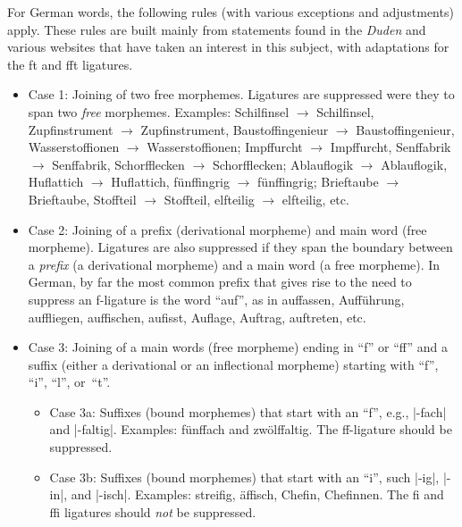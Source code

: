 \documentclass[11pt]{article}
\begin{document}
For German words, the following rules (with various exceptions and adjustments) apply. These rules are built mainly from statements found in the \emph{Duden} and various websites that have taken an interest in this subject, with adaptations for the ft and fft ligatures.
\begin{itemize}
\item Case 1: Joining of two free morphemes. Ligatures are suppressed were they to span two \emph{free} morphemes. Examples: Schil\mbox{fi}nsel $\to$ Schilfinsel, Zup\mbox{fi}nstrument $\to$ Zupfinstrument, Bausto\mbox{ffi}ngenieur $\to$ Baustoffingenieur, Wassersto\mbox{ffi}onen $\to$ Wasserstoffionen; Imp\mbox{ff}urcht $\to$ Impffurcht, Sen\mbox{ff}abrik $\to$ Senffabrik, Schor\mbox{ffl}ecken $\to$ Schorfflecken; Ablau\mbox{fl}ogik $\to$ Ablauflogik, Hu\mbox{fl}attich $\to$ Huflattich, fün\mbox{ffi}ngrig $\to$ fünf\mbox{fi}ngrig; Brie\mbox{ft}aube $\to$ Brieftaube, Sto\mbox{fft}eil $\to$ Stoffteil, el\mbox{ft}eilig $\to$ elfteilig, etc.


\item Case 2: Joining of a prefix (derivational morpheme) and main word (free morpheme). Ligatures are also suppressed if they span the boundary between a \emph{prefix} (a derivational morpheme) and a main word (a free morpheme). In German, by far the most common prefix that gives rise to the need to suppress an f-ligature is the word \enquote{auf}, as in auffassen, Aufführung, auffliegen, auffischen, auf\breaklig iss\breaklig t, Auflage, Auftrag, auftreten, etc.

\item Case 3: Joining of a main words (free morpheme) ending in \enquote{f} or \enquote{ff} and a suffix (either a derivational or an inflectional morpheme) starting with \enquote{f}, \enquote{i}, \enquote{l}, or~\enquote{t}.

\begin{itemize}
\item Case 3a: Suffixes (bound morphemes) that start with an \enquote{f}, e.g., |-fach| and |-faltig|. Examples: fünffach and zwölffaltig. The ff-ligature should be suppressed. 

\item Case 3b: Suffixes (bound morphemes) that start with an \enquote{i}, such |-ig|, |-in|, and |-isch|. Examples: streifig, äffisch, Chefin, Chefinnen. The fi and ffi ligatures should \emph{not} be suppressed. 


\end{itemize}
\end{itemize}
\end{document}
